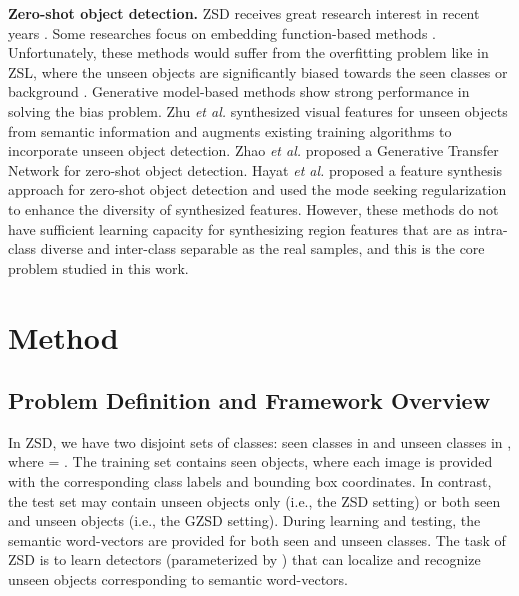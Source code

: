 \documentclass[10pt,twocolumn,letterpaper]{article}
\begin{document}
\textbf{Zero-shot object detection.} ZSD receives great research interest in recent years \cite{rahman2018zero, bansal2018zero, demirel2018zero, li2019zero, zheng2020background, rahman2020improved, zhu2020don, zhao2020gtnet, hayat2020synthesizing}. Some researches focus on embedding function-based methods \cite{rahman2018zero, bansal2018zero, demirel2018zero, li2019zero, zheng2020background, rahman2020improved}. Unfortunately, these methods would suffer from the overfitting problem like in ZSL, where the unseen objects are significantly biased towards the seen classes or background \cite{hayat2020synthesizing}. Generative model-based methods \cite{zhu2020don, zhao2020gtnet, hayat2020synthesizing} show strong performance in solving the bias problem. Zhu \emph{et al.} \cite{zhu2020don} synthesized visual features for unseen objects from semantic information and augments existing training algorithms to incorporate unseen object detection. Zhao \emph{et al.} \cite{zhao2020gtnet} proposed a Generative Transfer Network for zero-shot object detection. Hayat \emph{et al.}\cite{hayat2020synthesizing} proposed a feature synthesis approach for zero-shot object detection and used the mode seeking regularization \cite{mao2019mode} to enhance the diversity of synthesized features. However, these methods do not have sufficient learning capacity for synthesizing region features that are as intra-class diverse and inter-class separable as the real samples, and this is the core problem studied in this work.


\section{Method}
\label{sec:formatting}
\subsection{Problem Definition and Framework Overview}
In ZSD, we have two disjoint sets of classes: seen classes in  and unseen classes in , where    = . The training set contains seen objects,
where each image is provided with the corresponding class labels and bounding box coordinates. In contrast, the test set may contain unseen objects only (i.e., the ZSD setting) or both seen and unseen objects (i.e., the GZSD setting). During learning and testing, the semantic word-vectors  are provided for both seen and unseen classes. The task of ZSD is to learn detectors (parameterized by ) that can localize and recognize unseen objects corresponding to semantic word-vectors.
\end{document}
